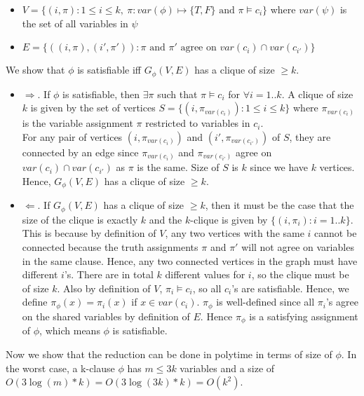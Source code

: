 \documentclass[12pt]{article}
\begin{document}
\begin{itemize}
  \begin{itemize}
    \item \(V = \{(i, \pi) : 1 \leq i \leq k,\ \pi:var(\phi) \mapsto \{T, F\} \text{ and } \pi \models c_i \}\) where \(var(\psi)\) is the set of all variables in \(\psi\)
    \item \(E = \{((i, \pi), (i', \pi')) : \pi \text{ and } \pi' \text{ agree on } var(c_i) \cap var(c_{i'})\}\)
  \end{itemize}
  We show that \(\phi\) is satisfiable iff \(G_\phi(V,E)\) has a clique of size \(\geq k\).
  \begin{itemize}
    \item \(\Rightarrow\). If \(\phi\) is satisfiable, then \(\exists \pi \) such that \(\pi \models c_i\) for \(\forall i = 1 .. k\). A clique of size \(k\) is given by the set of vertices \(S = \{(i, \pi_{var(c_i)}) : 1 \leq i \leq k\}\) where \(\pi_{var(c_i)}\) is the variable assignment \(\pi\) restricted to variables in \(c_i\).\\ For any pair of vertices \((i, \pi_{var(c_i)})\) and \((i', \pi_{var(c_{i'})})\) of \(S\), they are connected by an edge since \(\pi_{var(c_i)}\) and \(\pi_{var(c_{i'})}\) agree on \(var(c_i) \cap var(c_{i'})\) as \(\pi\) is the same. Size of \(S\) is \(k\) since we have \(k\) vertices. Hence, \(G_\phi(V,E)\) has a clique of size \(\geq k\).
    \item \(\Leftarrow\). If \(G_\phi(V,E)\) has a clique of size \(\geq k\), then it must be the case that the size of the clique is exactly \(k\) and the \(k\)-clique is given by \(\{(i, \pi_i) : i = 1 .. k\}\). This is because by definition of \(V\), any two vertices with the same \(i\) cannot be connected because the truth assignments \(\pi\) and \(\pi'\) will not agree on variables in the same clause. Hence, any two connected vertices in the graph must have different \(i\)'s. There are in total \(k\) different values for \(i\), so the clique must be of size \(k\). Also by definition of \(V\), \(\pi_i \models c_i\), so all \(c_i\)'s are satisfiable. Hence, we define \(\pi_\phi(x) = \pi_i(x)\) if \(x \in var(c_i)\). \(\pi_\phi\) is well-defined since all \(\pi_i\)'s agree on the shared variables by definition of \(E\). Hence \(\pi_\phi\) is a satisfying assignment of \(\phi\), which means \(\phi\) is satisfiable.
  \end{itemize}
  Now we show that the reduction can be done in polytime in terms of size of \(\phi\). In the worst case, a k-clause \(\phi\) has \(m \leq 3k\) variables and a size of \(O(3\log(m)*k) = O(3\log(3k)*k) = O(k^2)\).

\end{itemize}
\end{document}
